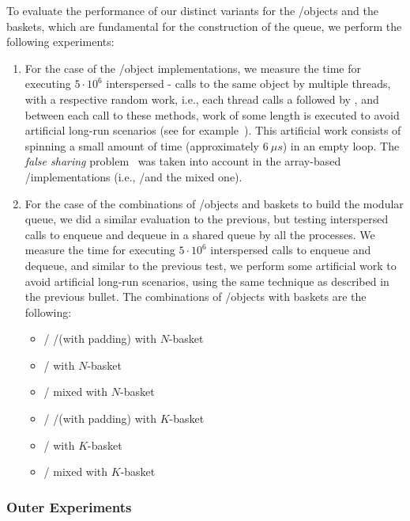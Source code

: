To evaluate the performance of our distinct variants for the \LL/\IC objects and the baskets, which are fundamental for the construction of the queue, we perform the following experiments:

\begin{enumerate}
    \item For the case of the \LL/\IC object implementations, we measure the time for executing \(5 \cdot 10^6\) interspersed \LL - \IC calls to the same object by multiple threads, with a respective random work, i.e., each thread calls a \LL followed by \IC, and between each call to these methods, work of some length is executed to avoid artificial long-run scenarios (see for example~\cite{DBLP_conf_ppopp_YangM16}). This artificial work consists of spinning a small amount of time (approximately \(6\ \mu{}s\)) in an empty loop. The \emph{false sharing} problem~\cite{BoloskyMichael93} was taken into account in the array-based \LL/\IC implementations (i.e., \R/\W and the mixed one).

    \item For the case of the combinations of \LL/\IC objects and baskets to build the modular queue, we did a similar evaluation to the previous, but testing interspersed calls to enqueue and dequeue in a shared queue by all the processes. We measure the time for executing \(5\cdot 10^6\) interspersed calls to enqueue and dequeue, and similar to the previous test, we perform some artificial work to avoid artificial long-run scenarios, using the same technique as described in the previous bullet. The combinations of \LL/\IC objects with baskets are the following:
    \begin{itemize}
        \item \LL/\IC{} \R/\W (with padding) with \(N\)-basket
        \item \LL/\IC{} \CAS with \(N\)-basket
        \item \LL/\IC{} mixed with \(N\)-basket
        \item \LL/\IC{} \R/\W (with padding) with \(K\)-basket
        \item \LL/\IC{} \CAS with \(K\)-basket
        \item \LL/\IC{} mixed with \(K\)-basket
    \end{itemize}
\end{enumerate}



\subsubsection{Outer Experiments}

